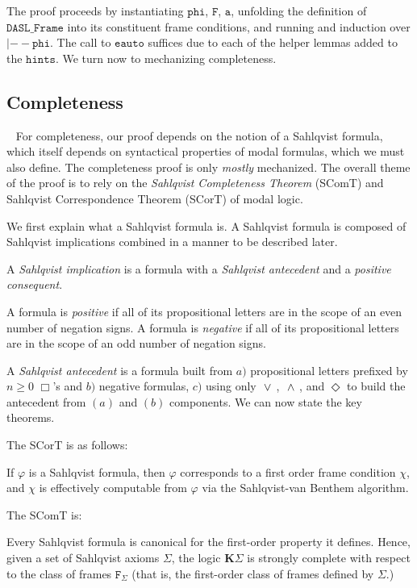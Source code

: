 The proof proceeds by instantiating $\mathtt{phi}$, $\mathtt{F}$, $\mathtt{a}$, unfolding the definition of $\mathtt{DASL\_Frame}$ into its constituent frame conditions, and running and induction over $\mathtt{|-- phi}$. The call to $\mathtt{eauto}$ suffices due to each of the helper lemmas added to the $\mathtt{hints}$. We turn now to mechanizing completeness.

\subsection{Completeness}~\label{sec:completeness}
For completeness, our proof depends on the notion of a Sahlqvist formula, which itself depends on syntactical properties of modal formulas, which we must also define. The completeness proof is only \emph{mostly} mechanized. The overall theme of the proof is to rely on the \emph{Sahlqvist Completeness Theorem} (SComT) and Sahlqvist Correspondence Theorem (SCorT) of modal logic.

We first explain what a Sahlqvist formula is. A Sahlqvist formula is composed of Sahlqvist implications combined in a manner to be described later.

A \emph{Sahlqvist implication} is a formula with a \emph{Sahlqvist antecedent} and a \emph{positive consequent}.

A formula is \emph{positive} if all of its propositional letters are in the scope of an even number of negation signs. A formula is \emph{negative} if all of its propositional letters are in the scope of an odd number of negation signs.

A \emph{Sahlqvist antecedent} is a formula built from $a)$ propositional letters prefixed by $n\geq0$ $\Box$'s and $b)$ negative formulas, $c)$ using only ${\ \vee \ }$, ${\ \wedge \ }$, and $\Diamond$ to build the antecedent from $(a)$ and $(b)$ components. We can now state the key theorems.

The SCorT is as follows:
\begin{theorem}
	If $\varphi$ is a Sahlqvist formula, then $\varphi$ corresponds to a first order frame condition $\chi$, and $\chi$ is effectively computable from $\varphi$ via the Sahlqvist-van Benthem algorithm.
\end{theorem}

The SComT is:
\begin{theorem}
	Every Sahlqvist formula is canonical for the first-order property it defines. Hence, given a set of Sahlqvist axioms $\Sigma$, the logic $\mathbf{K}\Sigma$ is strongly complete with respect to the class of frames $\mathtt{F}_\Sigma$ (that is, the first-order class of frames defined by $\Sigma$.)
\end{theorem}

